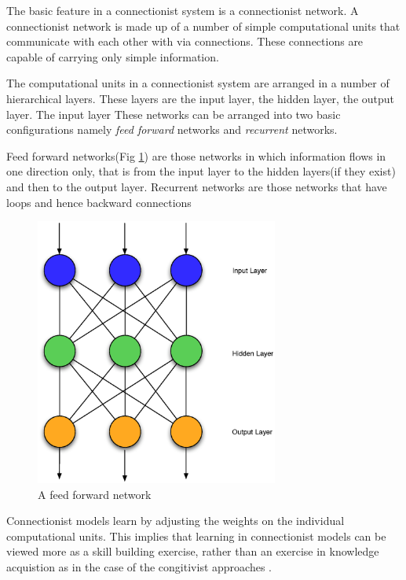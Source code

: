      The basic feature in a connectionist system is a connectionist
     network. A connectionist network is made up of a number of simple
     computational units that communicate with each other with via
     connections. These connections are capable of carrying only
     simple information.
     
     The computational units in a connectionist system are arranged in
     a number of hierarchical layers. These layers are the input
     layer, the hidden layer, the output layer. The input layer These
     networks can be arranged into two basic configurations namely
     \emph{feed forward} networks and \emph{recurrent} networks.

     Feed forward networks(Fig \ref{ASCA_AFFN}) are those networks in
     which information flows in one direction only, that is from the
     input layer to the hidden layers(if they exist) and then to the
     output layer. Recurrent networks are those networks that have
     loops and hence backward connections

     \begin{figure}[htp]
     \centering
     \includegraphics[width=80mm]{FeedForwardNetwork.eps}
     \caption{A feed forward network}
     \label{ASCA_AFFN}
     \end{figure}
     
     Connectionist models learn by adjusting the weights on the
     individual computational units. This implies that learning in
     connectionist models can be viewed more as a skill building
     exercise, rather than an exercise in knowledge acquistion as in
     the case of the congitivist approaches
     \cite{DBLP:journals/tec/VernonMS07}.
     
